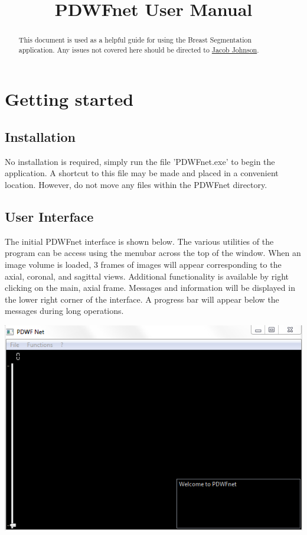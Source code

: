 \documentclass[twoside,a4paper]{refart}
\title{PDWFnet User Manual}
\author{}
\date{}
\begin{document}
\maketitle

\begin{abstract}
        This document is used as a helpful guide for using the Breast Segmentation application. Any issues not covered here should be directed to \href{mailto:jmjohnson33@wisc.edu}{Jacob Johnson}.
\end{abstract}

\tableofcontents

\newpage


\section{Getting started}
\subsection{Installation}
No installation is required, simply run the file 'PDWFnet.exe' to begin the application. A shortcut to this file may be made and placed in a convenient location. However, do not move any files within the PDWFnet directory.

\subsection{User Interface}

The initial PDWFnet interface is shown below. The various utilities of the program can be access using the menubar across the top of the window. When an image volume is loaded, 3 frames of images will appear corresponding to the axial, coronal, and sagittal views. Additional functionality is available by right clicking on the main, axial frame. Messages and information will be displayed in the lower right corner of the interface. A progress bar will appear below the messages during long operations.

\includegraphics[width=.7\textwidth]{InitialInterface.png}
\end{document}
